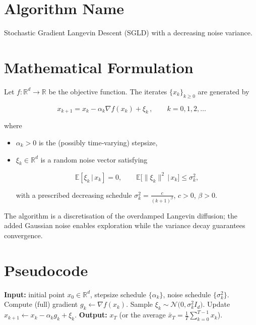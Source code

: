 \documentclass{article}
\begin{document}
\section*{Algorithm Name}
Stochastic Gradient Langevin Descent (SGLD) with a decreasing noise variance.

\section*{Mathematical Formulation}
Let $f:\mathbb{R}^{d}\rightarrow\mathbb{R}$ be the objective function.  
The iterates $\{x_k\}_{k\ge 0}$ are generated by  

\[
\boxed{\,x_{k+1}=x_k-\alpha_k \nabla f(x_k)+\xi_k\,},\qquad k=0,1,2,\dots
\]

where  

\begin{itemize}
    \item $\alpha_k>0$ is the (possibly time‑varying) stepsize,
    \item $\xi_k\in\mathbb{R}^{d}$ is a random noise vector satisfying  

    \[
    \mathbb{E}[\xi_k\,|\,x_k]=0,\qquad 
    \mathbb{E}\big[\|\xi_k\|^{2}\,\big|\,x_k\big]\le \sigma_k^{2},
    \]  

    with a prescribed decreasing schedule $\sigma_k^{2}= \frac{c}{(k+1)^{\beta}}$, $c>0$, $\beta>0$.
\end{itemize}

The algorithm is a discretisation of the overdamped Langevin diffusion; the added Gaussian noise enables exploration while the variance decay guarantees convergence.

\section*{Pseudocode}
\begin{algorithm}[H]
\caption{SGLD with Decreasing Noise}
\begin{algorithmic}[1]
\State \textbf{Input:} initial point $x_{0}\in\mathbb{R}^{d}$, stepsize schedule $\{\alpha_k\}$, noise schedule $\{\sigma_k^{2}\}$.
    \State Compute (full) gradient $g_k\gets \nabla f(x_k)$.
    \State Sample $\xi_k\sim\mathcal{N}\!\big(0,\sigma_k^{2}I_d\big)$.
    \State Update $x_{k+1}\gets x_k-\alpha_k g_k+\xi_k$.
\EndFor
\State \textbf{Output:} $x_T$ (or the average $\bar x_T=\frac1T\sum_{k=0}^{T-1}x_k$).
\end{algorithmic}
\end{algorithm}
\end{document}
